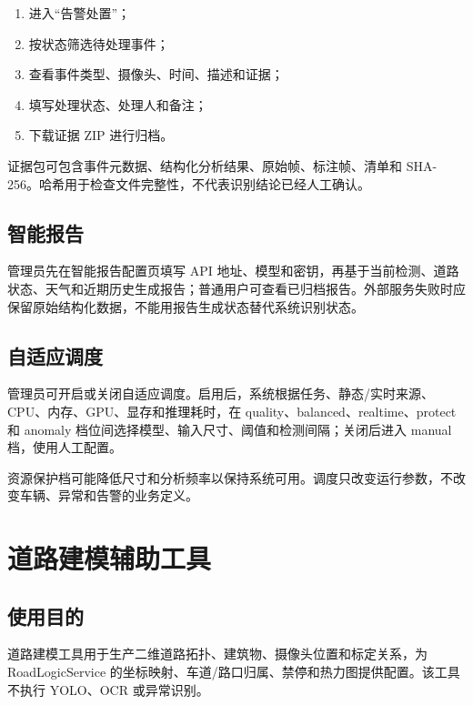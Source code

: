 \begin{enumerate}
\def\labelenumi{\arabic{enumi}.}
\tightlist
\item
  进入``告警处置''；
\item
  按状态筛选待处理事件；
\item
  查看事件类型、摄像头、时间、描述和证据；
\item
  填写处理状态、处理人和备注；
\item
  下载证据 ZIP 进行归档。
\end{enumerate}

证据包可包含事件元数据、结构化分析结果、原始帧、标注帧、清单和 SHA-256。哈希用于检查文件完整性，不代表识别结论已经人工确认。

\subsection{智能报告}\label{manual-ux667aux80fdux62a5ux544a}

管理员先在智能报告配置页填写 API 地址、模型和密钥，再基于当前检测、道路状态、天气和近期历史生成报告；普通用户可查看已归档报告。外部服务失败时应保留原始结构化数据，不能用报告生成状态替代系统识别状态。

\subsection{自适应调度}\label{manual-ux81eaux9002ux5e94ux8c03ux5ea6}

管理员可开启或关闭自适应调度。启用后，系统根据任务、静态/实时来源、CPU、内存、GPU、显存和推理耗时，在 quality、balanced、realtime、protect 和 anomaly 档位间选择模型、输入尺寸、阈值和检测间隔；关闭后进入 manual 档，使用人工配置。

资源保护档可能降低尺寸和分析频率以保持系统可用。调度只改变运行参数，不改变车辆、异常和告警的业务定义。

\section{道路建模辅助工具}\label{manual-ux9053ux8defux5efaux6a21ux8f85ux52a9ux5de5ux5177}

\subsection{使用目的}\label{manual-ux4f7fux7528ux76eeux7684}

道路建模工具用于生产二维道路拓扑、建筑物、摄像头位置和标定关系，为 RoadLogicService 的坐标映射、车道/路口归属、禁停和热力图提供配置。该工具不执行 YOLO、OCR 或异常识别。

